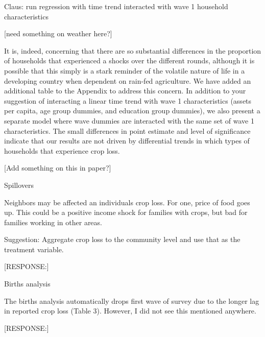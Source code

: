 \documentclass[letterpaper,12pt]{article}
\begin{document}
\begin{description}
[RESPONSE:] 

Claus: run regression with time trend interacted with wave 1 household characteristics

[need something on weather here?]

It is, indeed, concerning that there are so substantial
differences in the proportion of households that experienced a 
shocks over the different rounds, although it is possible that
this simply is a stark reminder of the volatile nature of life
in a developing country when dependent on rain-fed agriculture.
We have added an additional table to the Appendix to address this
concern. In addition to your suggestion of interacting a linear
time trend with wave 1 characteristics (assets per capita,
age group dummies, and education group dummies), we also present
a separate model where wave dummies are interacted with the
same set of wave 1 characteristics.
The small differences in point estimate and level of significance 
indicate that our results are not driven by differential trends
in which types of households that experience crop loss.

[Add something on this in paper?]


\item Spillovers

Neighbors may be affected an individuals crop loss. For one, price of
food goes up. This could be a positive income shock for families with
crops, but bad for families working in other areas.

Suggestion: Aggregate crop loss to the community level and use that as
the treatment variable.


[RESPONSE:]


\item Births analysis

The births analysis automatically drops first wave of survey due to the
longer lag in reported crop loss (Table 3). However, I did not see this
mentioned anywhere.

[RESPONSE:]


\end{description}


\newpage


\end{document}
